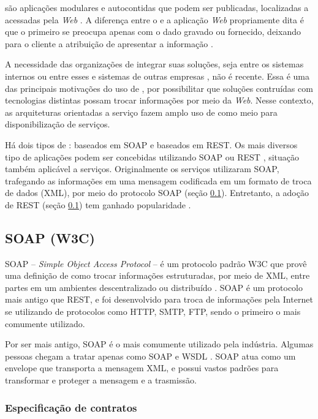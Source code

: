 \ws{} são aplicações modulares e autocontidas que podem ser publicadas,
localizadas a acessadas pela \textit{Web} \cite{alonso2004web}. A diferença
entre o \ws{} e a aplicação \textit{Web} propriamente dita é que o primeiro se
preocupa apenas com o dado gravado ou fornecido, deixando para o cliente a atribuição de apresentar a
informação \cite{serrano2014service}.

A necessidade das organizações de integrar suas soluções, seja
entre os sistemas internos ou entre esses e sistemas de outras empresas
\cite{rao2004survey}, não é recente. Essa é uma das principais motivações do uso
de \ws{}, por possibilitar que soluções contruídas com tecnologias distintas possam trocar
informações por meio da \textit{Web}. Nesse contexto, as arquiteturas
orientadas a serviço fazem amplo uso de \ws{} como meio para disponibilização de serviços.

Há dois tipos de \ws{}: baseados em SOAP e baseados em REST. Os mais diversos
tipo de aplicações podem ser concebidas utilizando SOAP ou REST \ws{}, situação também aplicável a serviços.
Originalmente os serviços utilizaram \ws{} SOAP, trafegando as informações em
uma mensagem codificada em um formato de troca de dados (XML), por meio do
protocolo SOAP (seção \ref{secaoSOAP}). Entretanto, a adoção de \ws{} REST
(seção \ref{secaoSOAP}) tem ganhado popularidade \cite{mumbaikar2013web}.

\subsection{SOAP (W3C) }
\label{secaoSOAP}
\vspace{-6mm}

SOAP -- \textit{Simple Object Access Protocol} -- é um protocolo padrão W3C que
provê uma definição de como trocar informações estruturadas, por meio de XML, entre
partes em um ambientes descentralizado ou distribuído \cite{WSDLSite}. SOAP é um
protocolo mais antigo que REST, e foi desenvolvido para troca de informações
pela Internet se utilizando de protocolos como HTTP, SMTP, FTP, sendo o primeiro
o mais comumente utilizado.

Por ser mais antigo, SOAP é o \ws{} mais comumente utilizado pela indústria.
Algumas pessoas chegam a tratar \ws{} apenas como SOAP e WSDL
\cite{serrano2014service}. SOAP atua como um envelope que transporta a mensagem
XML, e possui vastos padrões para transformar e proteger a mensagem e a
trasmissão. 


\subsubsection{Especificação de contratos}
\vspace{-6mm}

